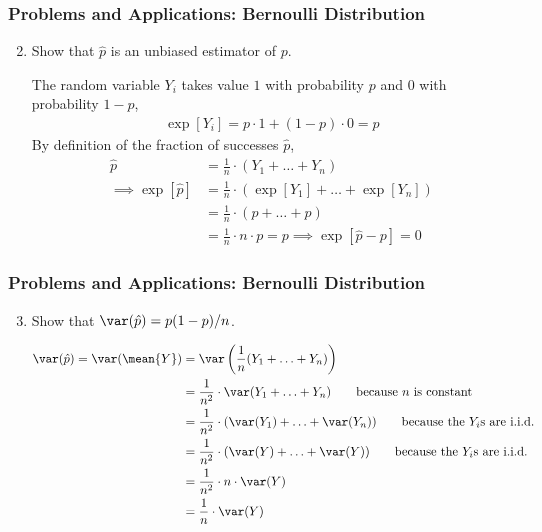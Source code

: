 \begin{frame}
\frametitle{Problems and Applications: Bernoulli Distribution}
\ask
\begin{enumerate}\setcounter{enumi}{1}

\item Show that $\hat{p}$ is an unbiased estimator of $p$.

\begin{answer}
The random variable $Y_i$ takes value $1$ with probability $p$ and $0$ with probability $1-p$,
\begin{align*}
\exp[Y_i] 
  = p \cdot 1 + (1-p) \cdot 0 = p
\end{align*}
By definition of the fraction of successes $\hat{p}$,
\begin{align*}
\hat{p}
  & = \frac{1}{n} \cdot (Y_1 + \ldots + Y_n)\\
\implies 
\exp[\hat{p}]
  & = \frac{1}{n} \cdot (\exp[Y_1] + \ldots + \exp[Y_n])\\
  & = \frac{1}{n} \cdot (p + \ldots + p)\\
  & = \frac{1}{n} \cdot n \cdot p
    = p
\implies
  \exp[\hat{p}-p] 
    = 0
\end{align*}
\end{answer}

\end{enumerate}
\end{frame}


\begin{frame}
\frametitle{Problems and Applications: Bernoulli Distribution}
\ask
\begin{enumerate}\setcounter{enumi}{2}

\item Show that $\var(\hat{p})=p(1-p)/n$.

\begin{answer}
\begin{align*}
\var(\hat{p}) 
    = \var(\mean{Y})
  & = \var\left(\frac{1}{n}(Y_1 + \ldots + Y_n)\right)\\
  & = \frac{1}{n^2} \cdot \var(Y_1 + \ldots + Y_n)
      \qquad \text{because $n$ is constant}\\
  & = \frac{1}{n^2} \cdot (\var(Y_1) + \ldots + \var(Y_n))
      \qquad \text{because the $Y_i$s are i.i.d.}\\
  & = \frac{1}{n^2} \cdot (\var(Y) + \ldots + \var(Y))
      \qquad \text{because the $Y_i$s are i.i.d.}\\
  & = \frac{1}{n^2} \cdot n \cdot \var(Y)\\
  & = \frac{1}{n} \cdot \var(Y)
\end{align*}
\end{answer}

\end{enumerate}
\end{frame}


